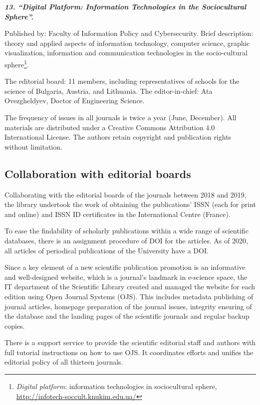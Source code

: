 \documentclass[a4paper,
fontsize=11pt,
oneside,
numbers=noperiodatend,
parskip=half-,
bibliography=totoc,
final
]{scrartcl}
\begin{document}
\textbf{\emph{13. \enquote{Digital Platform: Information Technologies in
the Sociocultural Sphere}.}}

Published by: Faculty of Information Policy and Cybersecurity. Brief
description: theory and applied aspects of information technology,
computer science, graphic visualization, information and communication
technologies in the socio-cultural sphere\footnote{\emph{Digital
  platform}: information technologies in sociocultural sphere,
  \url{http://infotech-soccult.knukim.edu.ua/}}.

The editorial board: 11 members, including representatives of schools
for the science of Bulgaria, Austria, and Lithuania. The
editor-in-chief: Ata Ovezgheldyev, Doctor of Engineering Science.

The frequency of issues in all journals is twice a year (June,
December). All materials are distributed under a Creative Commons
Attribution 4.0 International License. The authors retain copyright and
publication rights without limitation.

\hypertarget{collaboration-with-editorial-boards}{%
\subsection{Collaboration with editorial
boards}\label{collaboration-with-editorial-boards}}

Collaborating with the editorial boards of the journals between 2018 and
2019, the library undertook the work of obtaining the publications' ISSN
(each for print and online) and ISSN ID certificates in the
International Centre (France).

To ease the findability of scholarly publications within a wide range of
scientific databases, there is an assignment procedure of DOI for the
articles. As of 2020, all articles of periodical publications of the
University have a DOI.

Since a key element of a new scientific publication promotion is an
informative and well-designed website, which is a journal's landmark in
e-science space, the IT department of the Scientific Library created and
managed the website for each edition using Open Journal Systems (OJS).
This includes metadata publishing of journal articles, homepage
preparation of the journal issues, integrity ensuring of the database
and the landing pages of the scientific journals and regular backup
copies.

There is a support service to provide the scientific editorial staff and
authors with full tutorial instructions on how to use OJS. It
coordinates efforts and unifies the editorial policy of all thirteen
journals.
\end{document}
